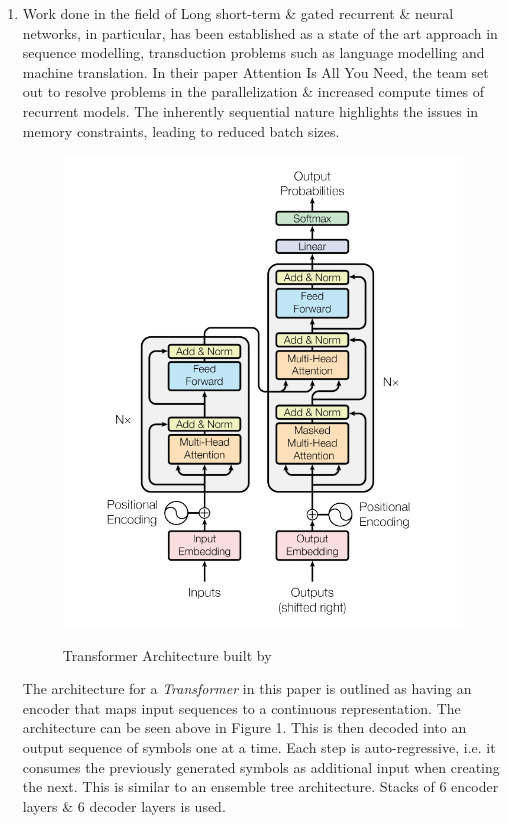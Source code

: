 \documentclass[11pt]{article}
\begin{document}
\begin{enumerate}
		\item Work done in the field of Long short-term \& gated recurrent \citep{lstm} \& \citep{recurrent} neural networks, in particular, has been established as a state of the art approach in sequence modelling, transduction problems such as language modelling and machine translation.
		In their paper Attention Is All You Need,\citep{atayl} the team set out to resolve problems in the parallelization \& increased compute times of recurrent models. The inherently sequential nature highlights the issues in memory constraints, leading to reduced batch sizes.
		\begin{figure}[h!]
			\centering
			\includegraphics[scale=0.4]{transformer.png}
			\label{fig1}
			\caption{Transformer Architecture built by \cite{atayl}}
		\end{figure}
		The architecture for a \textit{Transformer} in this paper is outlined as having an encoder that maps input sequences to a continuous representation. The architecture can be seen above in Figure 1. This is then decoded into an output sequence of symbols one at a time. Each step is auto-regressive, i.e. it consumes the previously generated symbols as additional input when creating the next. This is similar to an ensemble tree architecture. Stacks of 6 encoder layers \& 6 decoder layers is used.\\

\end{enumerate}
\end{document}
